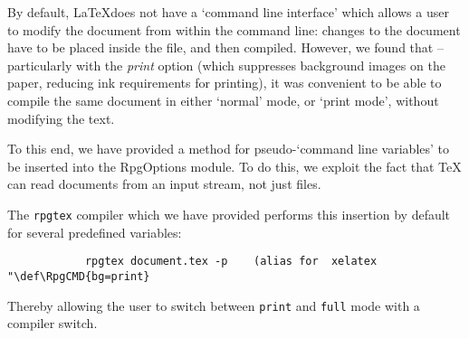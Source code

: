 		By default, \LaTeX does not have a `command line interface' which allows a user to modify the document from within the command line: changes to the document have to be placed inside the file, and then compiled. However, we found that -- particularly with the \textit{print} option (which suppresses background images on the paper, reducing ink requirements for printing), it was convenient to be able to compile the same document in either `normal' mode, or `print mode', without modifying the text.

		To this end, we have provided a method for pseudo-`command line variables' to be inserted into the RpgOptions module. To do this, we exploit the fact that \TeX{} can read documents from an input stream, not just files.


		\begin{macrolist}
		\end{macrolist}

		The \verb|rpgtex| compiler which we have provided  performs this insertion by default for several predefined variables:

		\begin{lstlisting}
			rpgtex document.tex -p    (alias for  xelatex "\def\RpgCMD{bg=print} 
		\end{lstlisting}

		Thereby allowing the user to switch between \verb|print| and \verb|full| mode with a compiler switch.

		
